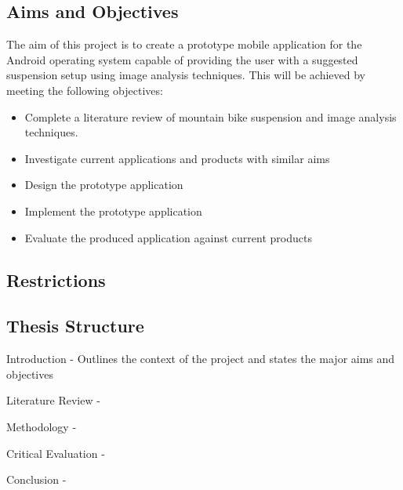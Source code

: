 \subsection{Aims and Objectives}
	The aim of this project is to create a prototype mobile application for the Android operating system capable of providing the user with a suggested suspension setup using image analysis techniques. This will be achieved by meeting the following objectives:
	\begin{itemize}
		\item Complete a literature review of mountain bike suspension and image analysis techniques.
		\item Investigate current applications and products with similar aims
		\item Design the prototype application
		\item Implement the prototype application 
		\item Evaluate the produced application against current products
	\end{itemize}
\subsection{Restrictions}

\subsection{Thesis Structure}
\begin{chapterList}
	\item Introduction - Outlines the context of the project and states the major aims and objectives
	\item Literature Review - 
	\item Methodology - 
	\item Critical Evaluation - 
	\item Conclusion - 
\end{chapterList}
	